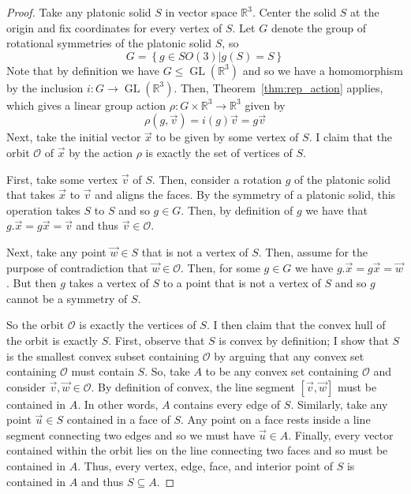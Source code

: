\documentclass[12]{amsart}
\newcommand{\orb}[0]{\mathcal{O}}
\newcommand{\set}[1]{ \left\{ #1 \right\} }
\DeclareMathOperator{\GL}{GL}
\begin{document}
\begin{proof}
Take any platonic solid $S$ in vector space $\mathbb{R}^3$. Center the solid $S$ at the origin and fix coordinates for every vertex of $S$. Let $G$ denote the group of rotational symmetries of the platonic solid $S$, so
$$ G = \set{g \in SO(3) \vert g(S) = S} $$
Note that by definition we have $G \leq \GL(\mathbb{R}^3)$ and so we have a homomorphism by the inclusion $i: G \to \GL(\mathbb{R}^3)$. Then, Theorem~\ref{thm:rep_action} applies, which gives a linear group action $\rho: G \times \mathbb{R}^3 \to \mathbb{R}^3$ given by
	$$\rho(g,\vec{v}) = i(g)\vec{v} = g\vec{v}$$
Next, take the initial vector $\vec{x}$ to be given by some vertex of $S$. I claim that the orbit $\orb$ of $\vec{x}$ by the action $\rho$ is exactly the set of vertices of $S$. 

First, take some vertex $\vec{v}$ of $S$. Then, consider a rotation $g$ of the platonic solid that takes $\vec{x}$ to $\vec{v}$ and aligns the faces. By the symmetry of a platonic solid, this operation takes $S$ to $S$ and so $g \in G$. Then, by definition of $g$ we have that $g.\vec{x} = g\vec{x} = \vec{v}$ and thus $\vec{v} \in \orb$.

Next, take any point $\vec{w} \in S$ that is not a vertex of $S$. Then, assume for the purpose of contradiction that $\vec{w} \in \orb$. Then, for some $g \in G$ we have $g.\vec{x} = g\vec{x} = \vec{w}$. But then $g$ takes a vertex of $S$ to a point that is not a vertex of $S$ and so $g$ cannot be a symmetry of $S$.

So the orbit $\orb$ is exactly the vertices of $S$. I then claim  that the convex hull of the orbit is exactly $S$. First, observe that $S$ is convex by definition; I show that $S$ is the smallest convex subset containing $\orb$ by arguing that any convex set containing $\orb$ must contain $S$. So, take $A$ to be any convex set containing $\orb$ and consider $\vec{v}, \vec{w} \in \orb$. By definition of convex, the line segment $[\vec{v},\vec{w}]$ must be contained in $A$. In other words, $A$ contains every edge of $S$. Similarly, take any point $\vec{u} \in S$ contained in a face of $S$. Any point on a face rests inside a line segment connecting two edges and so we must have $\vec{u} \in A$. Finally, every vector contained within the orbit lies on the line connecting two faces and so must be contained in $A$. Thus, every vertex, edge, face, and interior point of $S$ is contained in $A$ and thus $S \subseteq A$.  
\end{proof}
\end{document}
